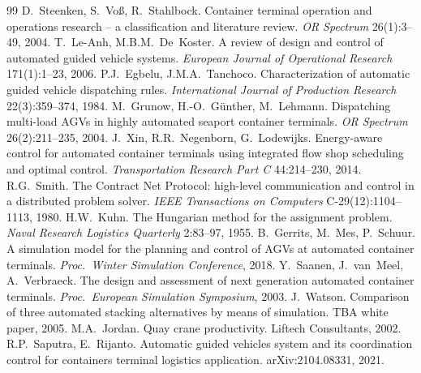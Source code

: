 \documentclass[11pt,a4paper]{article}
\begin{document}
\begin{thebibliography}{99}\small
{} D.~Steenken, S.~Vo{\ss}, R.~Stahlbock. Container terminal operation and operations research -- a classification and literature review. \emph{OR Spectrum} 26(1):3--49, 2004.
 T.~Le-Anh, M.B.M.~De~Koster. A review of design and control of automated guided vehicle systems. \emph{European Journal of Operational Research} 171(1):1--23, 2006.
 P.J.~Egbelu, J.M.A.~Tanchoco. Characterization of automatic guided vehicle dispatching rules. \emph{International Journal of Production Research} 22(3):359--374, 1984.
 M.~Grunow, H.-O.~G\"unther, M.~Lehmann. Dispatching multi-load AGVs in highly automated seaport container terminals. \emph{OR Spectrum} 26(2):211--235, 2004.
 J.~Xin, R.R.~Negenborn, G.~Lodewijks. Energy-aware control for automated container terminals using integrated flow shop scheduling and optimal control. \emph{Transportation Research Part C} 44:214--230, 2014.
 R.G.~Smith. The Contract Net Protocol: high-level communication and control in a distributed problem solver. \emph{IEEE Transactions on Computers} C-29(12):1104--1113, 1980.
 H.W.~Kuhn. The Hungarian method for the assignment problem. \emph{Naval Research Logistics Quarterly} 2:83--97, 1955.
 B.~Gerrits, M.~Mes, P.~Schuur. A simulation model for the planning and control of AGVs at automated container terminals. \emph{Proc.\ Winter Simulation Conference}, 2018.
 Y.~Saanen, J.~van~Meel, A.~Verbraeck. The design and assessment of next generation automated container terminals. \emph{Proc.\ European Simulation Symposium}, 2003.
 J.~Watson. Comparison of three automated stacking alternatives by means of simulation. TBA white paper, 2005.
 M.A.~Jordan. Quay crane productivity. Liftech Consultants, 2002.
 R.P.~Saputra, E.~Rijanto. Automatic guided vehicles system and its coordination control for containers terminal logistics application. arXiv:2104.08331, 2021.
\end{thebibliography}
\end{document}

